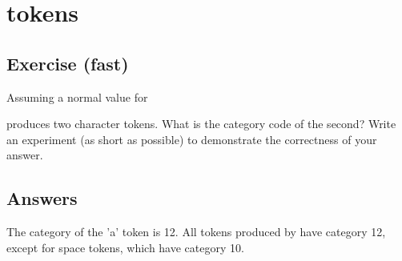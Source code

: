 

\chapter{ tokens}

\section{Exercise (fast)}



\begin{comment}

[Posted to info-tex on 4 Nov 91; see exercise.004]
***********************************************************************
*** Exercise 5 (fast):
\end{comment}

Assuming a normal value for \cmd{\escapechar}
\begin{lcode}
     \string\a
\end{lcode}
produces two character tokens. What is the category code of the second?
Write an experiment (as short as possible) to demonstrate the
correctness of your answer.




\section{Answers}



\begin{comment}

[Posted to info-tex on 5 Dec 91; see answer.004]
"***********************************************************************
"*** Exercise 5 (fast):
"
"Assuming a normal value for \escapechar,
"
"     \string\a
"
"produces two character tokens. What is the category code of the second?
"Write an experiment (as short as possible) to demonstrate the
"correctness of your answer.
\end{comment}

The category of the 'a' token is 12. All tokens produced by \cmd{\string}
have category 12, except for space tokens, which have category 10.

